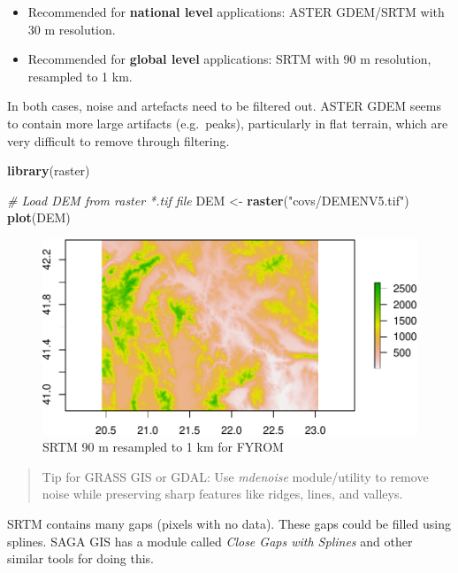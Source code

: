 \documentclass[10pt,b5paper,]{book}
\newenvironment{Shaded}{\begin{snugshade}}{\end{snugshade}}
\newcommand{\CommentTok}[1]{\textcolor[rgb]{0.56,0.35,0.01}{\textit{#1}}}
\newcommand{\KeywordTok}[1]{\textcolor[rgb]{0.13,0.29,0.53}{\textbf{#1}}}
\newcommand{\NormalTok}[1]{#1}
\newcommand{\StringTok}[1]{\textcolor[rgb]{0.31,0.60,0.02}{#1}}
\providecommand{\tightlist}{%
  \setlength{\itemsep}{0pt}\setlength{\parskip}{0pt}}
\theoremstyle{definition}
\theoremstyle{definition}
\theoremstyle{definition}
\theoremstyle{remark}
\begin{document}
\begin{itemize}
\tightlist
\item
  Recommended for \textbf{national level} applications: ASTER GDEM/SRTM
  with 30 m resolution.
\item
  Recommended for \textbf{global level} applications: SRTM with 90 m
  resolution, resampled to 1 km.
\end{itemize}

In both cases, noise and artefacts need to be filtered out. ASTER GDEM
seems to contain more large artifacts (e.g.~peaks), particularly in flat
terrain, which are very difficult to remove through filtering.

\begin{Shaded}
\begin{Highlighting}[]
\KeywordTok{library}\NormalTok{(raster)}

\CommentTok{# Load DEM from raster *.tif file}
\NormalTok{DEM <-}\StringTok{ }\KeywordTok{raster}\NormalTok{(}\StringTok{"covs/DEMENV5.tif"}\NormalTok{)}
\KeywordTok{plot}\NormalTok{(DEM)}
\end{Highlighting}
\end{Shaded}

\begin{figure}
\centering
\includegraphics{SOCMapping_files/figure-latex/unnamed-chunk-18-1.pdf}
\caption{\label{fig:unnamed-chunk-18}SRTM 90 m resampled to 1 km for FYROM}
\end{figure}

\begin{quote}
Tip for GRASS GIS or GDAL: Use \emph{mdenoise} module/utility to remove
noise while preserving sharp features like ridges, lines, and valleys.
\end{quote}

SRTM contains many gaps (pixels with no data). These gaps could be
filled using splines. SAGA GIS has a module called \emph{Close Gaps with
Splines} and other similar tools for doing this.
\end{document}
